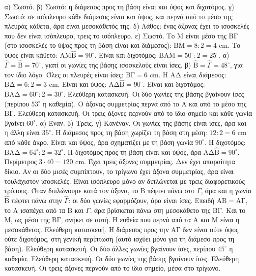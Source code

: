  α) Σωστό. β) Σωστό: η διάμεσος προς τη βάση είναι και ύψος και διχοτόμος. γ) Σωστό: σε ισόπλευρο κάθε διάμεσος είναι και ύψος, και περνά από το μέσο της πλευράς κάθετα, άρα είναι μεσοκάθετός της. δ) Λάθος: ένας άξονας έχει το ισοσκελές που δεν είναι ισόπλευρο, τρεις το ισόπλευρο. ε) Σωστό.
 Το $\mathrm{Μ}$ είναι μέσο της $\mathrm{ΒΓ}$ (στο ισοσκελές το ύψος προς τη βάση είναι και διάμεσος): $\mathrm{ΒΜ}=8:2=4$ cm. Το ύψος είναι κάθετο: $\mathrm{ΑΜ}\hat{\mathrm{Β}}=90^\circ$. Είναι και διχοτόμος: $\mathrm{ΒΑΜ}=50^\circ:2=25^\circ$.
 α) $\hat{\Gamma}=\hat{\mathrm{Β}}=70^\circ$, γιατί οι γωνίες της βάσης ισοσκελούς είναι ίσες. β) $\hat{\mathrm{Β}}=\hat{\Gamma}=48^\circ$, για τον ίδιο λόγο.
 Όλες οι πλευρές είναι ίσες: $\mathrm{ΒΓ}=6$ cm. Η $\mathrm{ΑΔ}$ είναι διάμεσος: $\mathrm{ΒΔ}=6:2=3$ cm. Είναι και ύψος: $\mathrm{ΑΔ}\hat{\mathrm{Β}}=90^\circ$. Είναι και διχοτόμος: $\mathrm{ΒΑΔ}=60^\circ:2=30^\circ$.
 Ελεύθερη κατασκευή. Οι δύο γωνίες της βάσης βγαίνουν ίσες (περίπου $53^\circ$ η καθεμία). Ο άξονας συμμετρίας περνά από το $\mathrm{Α}$ και από το μέσο της $\mathrm{ΒΓ}$.
 Ελεύθερη κατασκευή. Οι τρεις άξονες περνούν από το ίδιο σημείο και κάθε γωνία βγαίνει $60^\circ$.
 α) Έναν. β) Τρεις. γ) Κανέναν.
 Οι γωνίες της βάσης είναι ίσες, άρα και η άλλη είναι $35^\circ$.
 Η διάμεσος προς τη βάση χωρίζει τη βάση στη μέση: $12:2=6$ cm από κάθε άκρο. Είναι και ύψος, άρα σχηματίζει με τη βάση γωνία $90^\circ$.
 Η διχοτόμος: $\mathrm{ΒΑΔ}=64^\circ:2=32^\circ$. Η διχοτόμος προς τη βάση είναι και ύψος, άρα $\mathrm{ΑΔ}\hat{\mathrm{Β}}=90^\circ$.
 Περίμετρος $3\cdot40=120$ cm. Έχει τρεις άξονες συμμετρίας.
 Δεν έχει απαραίτητα δίκιο. Αν οι δύο μισές συμπίπτουν, το τρίγωνο έχει άξονα συμμετρίας, άρα είναι τουλάχιστον ισοσκελές. Είναι ισόπλευρο μόνο αν διπλώνεται με τρεις διαφορετικούς τρόπους.
 Όταν διπλώνουμε κατά τον άξονα, το $\mathrm{Β}$ πέφτει πάνω στο $\Gamma$, άρα και η γωνία $\hat{\mathrm{Β}}$ πέφτει πάνω στην $\hat{\Gamma}$: οι δύο γωνίες εφαρμόζουν, άρα είναι ίσες.
 Επειδή $\mathrm{ΑΒ}=\mathrm{ΑΓ}$, το $\mathrm{Α}$ ισαπέχει από τα $\mathrm{Β}$ και $\Gamma$, άρα βρίσκεται πάνω στη μεσοκάθετο της $\mathrm{ΒΓ}$. Και το $\mathrm{Μ}$, ως μέσο της $\mathrm{ΒΓ}$, ανήκει σε αυτή. Η ευθεία που περνά από τα $\mathrm{Α}$ και $\mathrm{Μ}$ είναι η μεσοκάθετος.
 Ελεύθερη κατασκευή. Η διάμεσος προς την $\mathrm{ΑΓ}$ δεν είναι ούτε ύψος ούτε διχοτόμος, στη γενική περίπτωση (αυτό ισχύει μόνο για τη διάμεσο προς τη βάση).
 Ελεύθερη κατασκευή. Οι δύο άλλες γωνίες βγαίνουν ίσες, περίπου $45^\circ$ η καθεμία.
 Ελεύθερη κατασκευή. Οι δύο γωνίες της βάσης βγαίνουν ίσες.
 Ελεύθερη κατασκευή. Οι τρεις άξονες περνούν από το ίδιο σημείο, μέσα στο τρίγωνο.
